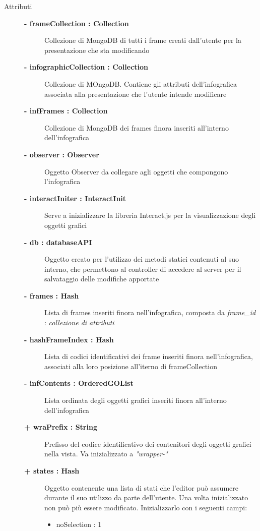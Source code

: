 \begin{description}
	
\item[Attributi] \hfill
	\begin{description}
		\item[\textbf{- frameCollection : Collection 			}] \hfill
			Collezione di MongoDB di tutti i frame creati dall'utente per la presentazione che sta modificando
		\item[\textbf{- infographicCollection : Collection			}] \hfill
			Collezione di MOngoDB. Contiene gli attributi dell'infografica associata alla presentazione che l'utente intende modificare
		\item[\textbf{- infFrames : Collection 			}] \hfill
			Collezione di MongoDB dei frames finora inseriti all'interno dell'infografica
		\item[\textbf{- observer : Observer 			}] \hfill
			Oggetto Observer da collegare agli oggetti che compongono l'infografica
		\item[\textbf{- interactIniter : InteractInit			}] \hfill
			Serve a inizializzare la libreria Interact.js per la visualizzazione degli oggetti grafici
		\item[\textbf{- db : databaseAPI			}] \hfill
			Oggetto creato per l'utilizzo dei metodi statici contenuti al suo interno, che permettono al controller di accedere al server per il salvataggio delle modifiche apportate 
		\item[\textbf{- frames : Hash			}] \hfill
			Lista di frames inseriti finora nell'infografica, composta da \textit{frame\_id} : \textit{collezione di attributi}
		\item[\textbf{- hashFrameIndex : Hash			}] \hfill
			Lista di codici identificativi dei frame inseriti finora nell'infografica, associati alla loro posizione all'iterno di frameCollection
		\item[\textbf{- infContents : OrderedGOList			}] \hfill
			Lista ordinata degli oggetti grafici inseriti finora all'interno dell'infografica
		\item[\textbf{+ wraPrefix : String			}] \hfill
			Prefisso del codice identificativo dei contenitori degli oggetti grafici nella vista. Va inizializzato a \textit{"wrapper-"}
		\item[\textbf{+ states : Hash			}] \hfill
			Oggetto contenente una lista di stati che l'editor può assumere durante il suo utilizzo da parte dell'utente. Una volta inizializzato non può più essere modificato. Inizializzarlo con i seguenti campi:
		\begin{itemize}
			\item noSelection : 1

\end{itemize}
\end{description}
\end{description}
